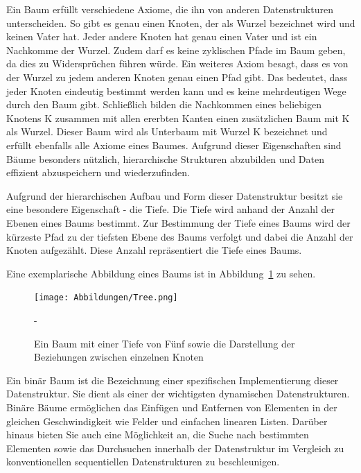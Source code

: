 Ein Baum erfüllt verschiedene Axiome, die ihn von anderen Datenstrukturen unterscheiden. So gibt es genau einen Knoten, der als Wurzel bezeichnet wird und keinen Vater hat. Jeder andere Knoten hat genau einen Vater und ist ein Nachkomme der Wurzel. Zudem darf es keine zyklischen Pfade im Baum geben, da dies zu Widersprüchen führen würde. Ein weiteres Axiom besagt, dass es von der Wurzel zu jedem anderen Knoten genau einen Pfad gibt. Das bedeutet, dass jeder Knoten eindeutig bestimmt werden kann und es keine mehrdeutigen Wege durch den Baum gibt. Schließlich bilden die Nachkommen eines beliebigen Knotens K zusammen mit allen ererbten Kanten einen zusätzlichen Baum mit K als Wurzel. Dieser Baum wird als Unterbaum mit Wurzel K bezeichnet und erfüllt ebenfalls alle Axiome eines Baumes. Aufgrund dieser Eigenschaften sind Bäume besonders nützlich, hierarchische Strukturen abzubilden und Daten effizient abzuspeichern und wiederzufinden. \autocite[389]{gumm_band_2016}

Aufgrund der hierarchischen Aufbau und Form dieser Datenstruktur besitzt sie eine besondere Eigenschaft - die Tiefe. Die Tiefe wird anhand der Anzahl der Ebenen eines Baums bestimmt. Zur Bestimmung der Tiefe eines Baums wird der kürzeste Pfad zu der tiefsten Ebene des Baums verfolgt und dabei die Anzahl der Knoten aufgezählt. Diese Anzahl repräsentiert die Tiefe eines Baums. \autocite[390]{gumm_band_2016}

Eine exemplarische Abbildung eines Baums ist in Abbildung~\ref{fig: tree} zu sehen.

\begin{figure}[t]
	\texttt{[image: Abbildungen/Tree.png]}
	\centering
	\caption[Binärbaum]{Ein Baum mit einer Tiefe von Fünf sowie die Darstellung der Beziehungen zwischen einzelnen Knoten \autocite[390]{gumm_band_2016}}-
	\label{fig: tree}
\end{figure}

Ein binär Baum ist die Bezeichnung einer spezifischen Implementierung dieser Datenstruktur. Sie dient als einer der wichtigsten dynamischen Datenstrukturen. Binäre Bäume ermöglichen das Einfügen und Entfernen von Elementen in der gleichen Geschwindigkeit wie Felder und einfachen linearen Listen. Darüber hinaus bieten Sie auch eine Möglichkeit an, die Suche nach bestimmten Elementen sowie das Durchsuchen innerhalb der Datenstruktur im Vergleich zu konventionellen sequentiellen Datenstrukturen zu beschleunigen. \autocite[617]{ernst_grundkurs_2020}

